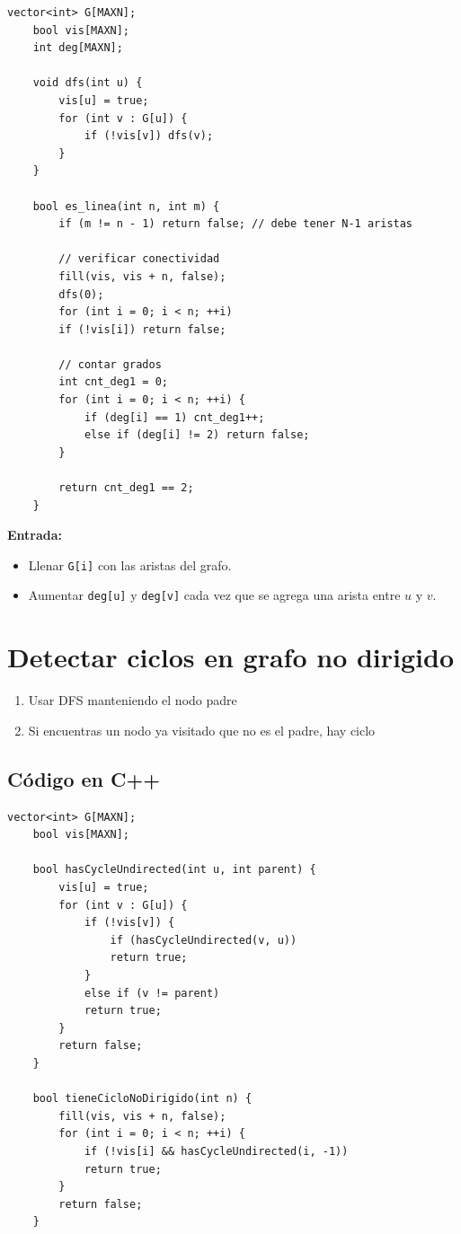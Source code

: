 \begin{lstlisting}[caption=Verificar si un grafo es una línea]
	vector<int> G[MAXN];
	bool vis[MAXN];
	int deg[MAXN];
	
	void dfs(int u) {
		vis[u] = true;
		for (int v : G[u]) {
			if (!vis[v]) dfs(v);
		}
	}
	
	bool es_linea(int n, int m) {
		if (m != n - 1) return false; // debe tener N-1 aristas
		
		// verificar conectividad
		fill(vis, vis + n, false);
		dfs(0);
		for (int i = 0; i < n; ++i)
		if (!vis[i]) return false;
		
		// contar grados
		int cnt_deg1 = 0;
		for (int i = 0; i < n; ++i) {
			if (deg[i] == 1) cnt_deg1++;
			else if (deg[i] != 2) return false;
		}
		
		return cnt_deg1 == 2;
	}
\end{lstlisting}

\textbf{Entrada:}
\begin{itemize}
	\item Llenar \texttt{G[i]} con las aristas del grafo.
	\item Aumentar \texttt{deg[u]} y \texttt{deg[v]} cada vez que se agrega una arista entre \( u \) y \( v \).
\end{itemize}
		
\section{Detectar ciclos en grafo no dirigido}

\begin{enumerate}
	\item Usar DFS manteniendo el nodo padre
	\item Si encuentras un nodo ya visitado que no es el padre, hay ciclo
\end{enumerate}

\subsection*{Código en C++}

\begin{lstlisting}[caption=Detectar ciclos en grafo no dirigido]
	vector<int> G[MAXN];
	bool vis[MAXN];
	
	bool hasCycleUndirected(int u, int parent) {
		vis[u] = true;
		for (int v : G[u]) {
			if (!vis[v]) {
				if (hasCycleUndirected(v, u)) 
				return true;
			}
			else if (v != parent) 
			return true;
		}
		return false;
	}
	
	bool tieneCicloNoDirigido(int n) {
		fill(vis, vis + n, false);
		for (int i = 0; i < n; ++i) {
			if (!vis[i] && hasCycleUndirected(i, -1))
			return true;
		}
		return false;
	}
\end{lstlisting}

